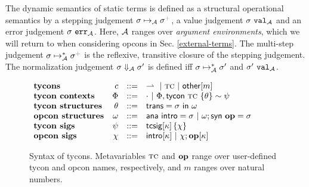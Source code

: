 \documentclass[10pt,preprint]{sigplanconf}
\newcommand{\moutput}{^{\color{gray}+}}
\begin{document}
The dynamic semantics of static terms is defined as a structural operational semantics by a stepping judgement $\sstep{\st}{\argEnv}{\st\moutput}$, a value judgement $\sigma~\mathtt{val}_{\mathcal{A}}$ and an error judgement $\sigma~\mathtt{err}_{\mathcal{A}}$. Here, $\mathcal{A}$ ranges over \emph{argument environments}, which we will  return to when considering opcons in Sec. \ref{external-terms}. The multi-step judgement $\smanystep{\st}{\argEnv}{\st\moutput}$ is the reflexive, transitive closure of the stepping judgement. The normalization judgement $\sigma \Downarrow_{\mathcal{A}} \sigma'$ is defined iff $\sigma \mapsto_{\mathcal{A}}^{*} \sigma'$ and $\sigma'~\mathtt{val}_{\mathcal{A}}$. %
\begin{figure}[t]
\small
$\begin{array}{lrcl}
\textbf{tycons} & c & ::= & \rightharpoonup ~|~ \textsc{tc} ~|~ {\sf other}[m]\\
\textbf{tycon contexts} & \Phi & ::= & \cdot ~|~ \Phi, {\sf tycon}~\textsc{tc} ~\{\theta\} \sim \psi\\
\textbf{tycon structures} & \theta & ::= & {\sf trans}=\sigma~{\sf in}~\omega \\
\textbf{opcon structures} & \omega & ::= & {\sf ana}~{\sf intro}=\sigma ~|~ \omega; {\sf syn}~\textbf{op}=\sigma\\
\textbf{tycon sigs} & \psi & ::= & {\sf tcsig}[\kappa]\,\{\chi\}\\
\textbf{opcon sigs}& \chi & ::= & {\sf intro}[\kappa] ~|~ \chi; \textbf{op}[\kappa]\\
\end{array}$
\caption{Syntax of tycons. Metavariables $\textsc{tc}$ and $\textbf{op}$ range over user-defined tycon and opcon names, respectively, and $m$ ranges over natural numbers.}
\label{syntax-TC}\vspace{-8px}
\end{figure}
\end{document}
